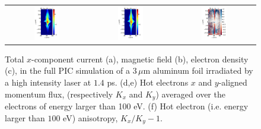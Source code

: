 \documentclass[aps,showpacs,superscriptaddress]{revtex4}
\begin{document}
\begin{figure}
{\begin{tabular}{ccc}
 \includegraphics[width=0.33\textwidth]{Kx_t104000_nat.png} 
 &\includegraphics[width=0.33\textwidth]{Ky_t104000_nat.png} 
 &\includegraphics[width=0.33\textwidth]{a_t104000_nat.png} 
\end{tabular}} 
\caption{\label{fig:PIC_las} 
Total $x$-component current (a), magnetic field (b), electron density (c),  in the full PIC simulation of a $3\, \mu$m aluminum foil irradiated by a high intensity laser at $1.4$ ps.
(d,e) Hot electrons $x$ and $y$-aligned momentum flux, (respectively $K_x$ and $K_y$) averaged over the electrons of energy larger than 100 eV.
(f) Hot electron (i.e. energy larger than $100$ eV) anisotropy, $K_x/K_y -1$.
}
\end{figure}
\end{document}
